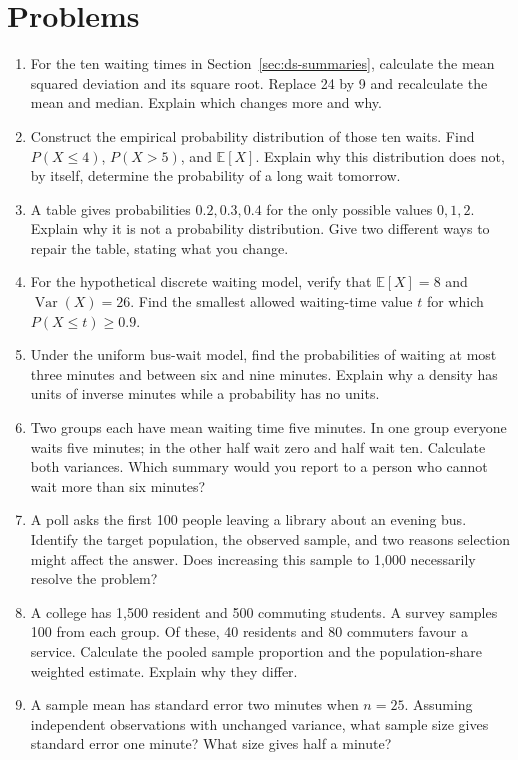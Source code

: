 \section*{Problems}
\begin{enumerate}
\item For the ten waiting times in Section~\ref{sec:ds-summaries}, calculate
the mean squared deviation and its square root. Replace 24 by 9 and
recalculate the mean and median. Explain which changes more and why.
\item Construct the empirical probability distribution of those ten waits.
Find $P(X\leq4)$, $P(X>5)$, and $\mathbb E[X]$. Explain why this distribution
does not, by itself, determine the probability of a long wait tomorrow.
\item A table gives probabilities $0.2,0.3,0.4$ for the only possible values
$0,1,2$. Explain why it is not a probability distribution. Give two different
ways to repair the table, stating what you change.
\item For the hypothetical discrete waiting model, verify that
$\mathbb E[X]=8$ and $\operatorname{Var}(X)=26$. Find the smallest allowed
waiting-time value $t$ for which $P(X\leq t)\geq 0.9$.
\item Under the uniform bus-wait model, find the probabilities of waiting
at most three minutes and between six and nine minutes. Explain why a
density has units of inverse minutes while a probability has no units.
\item Two groups each have mean waiting time five minutes. In one group
everyone waits five minutes; in the other half wait zero and half wait ten.
Calculate both variances. Which summary would you report to a person who
cannot wait more than six minutes?
\item A poll asks the first 100 people leaving a library about an evening
bus. Identify the target population, the observed sample, and two reasons
selection might affect the answer. Does increasing this sample to 1,000
necessarily resolve the problem?
\item A college has 1,500 resident and 500 commuting students. A survey
samples 100 from each group. Of these, 40 residents and 80 commuters favour
a service. Calculate the pooled sample proportion and the population-share
weighted estimate. Explain why they differ.
\item A sample mean has standard error two minutes when $n=25$. Assuming
independent observations with unchanged variance, what sample size gives
standard error one minute? What size gives half a minute?

\end{enumerate}

